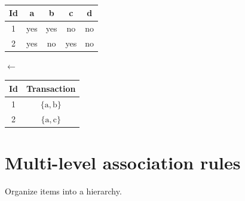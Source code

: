\begin{description}
        \begin{example} \phantom{}\\
            \begin{minipage}{0.35\textwidth}
                \begin{center}
                    \begin{tabular}{c|c|c|c|c}
                        \textbf{Id} & \textbf{a} & \textbf{b} & \textbf{c} & \textbf{d} \\
                        \hline
                        1 & yes & yes & no & no \\
                        2 & yes & no & yes & no \\
                    \end{tabular}
                \end{center}
            \end{minipage}
            $\leftarrow$
            \begin{minipage}{0.30\textwidth}
                \begin{center}
                    \begin{tabular}{c|c}
                        \textbf{Id} & \textbf{Transaction} \\
                        \hline
                        1 & $\{ \text{a}, \text{b} \}$ \\
                        2 & $\{ \text{a}, \text{c} \}$ \\
                    \end{tabular}
                \end{center}
            \end{minipage}
        \end{example}

\end{description}



\section{Multi-level association rules}
Organize items into a hierarchy.


